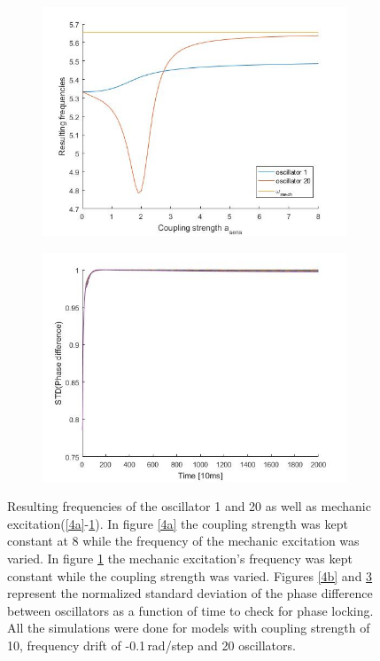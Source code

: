 \documentclass[a4paper]{scrartcl}
\begin{document}
\begin{figure}[h]
\begin{subfigure}[b]{0.49\textwidth}
		\includegraphics[width=\textwidth]{results/6.c/Freq_O_const.jpg}
		\caption{}\label{4c}
	\end{subfigure}
	\centering
	\begin{subfigure}[b]{0.49\textwidth}
		\centering
		\includegraphics[width=\textwidth]{results/6.c/Phase_O_const.jpg}
		\caption{}\label{4d}
	\end{subfigure}
	\caption{Resulting frequencies of the oscillator 1 and 20 as well as mechanic excitation(\ref{4a}-\ref{4c}). In figure \ref{4a} the coupling strength was kept constant at 8 while the frequency of the mechanic excitation was varied. In figure \ref{4c} the mechanic excitation's frequency was kept constant while the coupling strength was varied. Figures \ref{4b} and \ref{4d} represent the normalized standard deviation of the phase difference between oscillators as a function of time to check for phase locking. All the simulations were done for models with coupling strength of 10, frequency drift of -0.1\,rad/step and 20 oscillators.}
\end{figure}
\end{document}
